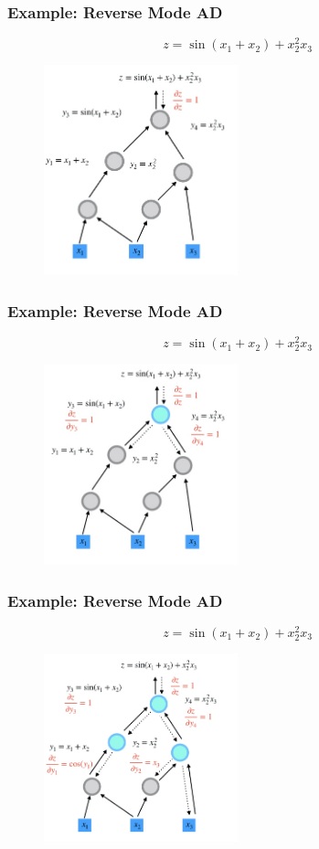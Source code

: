 \documentclass{beamer}
\begin{document}
\begin{frame}
	\frametitle{Example: Reverse Mode AD}
	$$z=\sin(x_1+x_2) + x_2^2x_3$$
	\begin{figure}[hbt]
		\centering
		\includegraphics[width=0.5\textwidth]{figures/bd1}
	\end{figure}


\end{frame}

\begin{frame}
	\frametitle{Example: Reverse Mode AD}
	$$z=\sin(x_1+x_2) + x_2^2x_3$$
	\begin{figure}[hbt]
		\centering
		\includegraphics[width=0.5\textwidth]{figures/bd2}
	\end{figure}
\end{frame}


\begin{frame}
	\frametitle{Example: Reverse Mode AD}
	$$z=\sin(x_1+x_2) + x_2^2x_3$$
	\begin{figure}[hbt]
		\centering
		\includegraphics[width=0.5\textwidth]{figures/bd3}
	\end{figure}
\end{frame}
\end{document}
